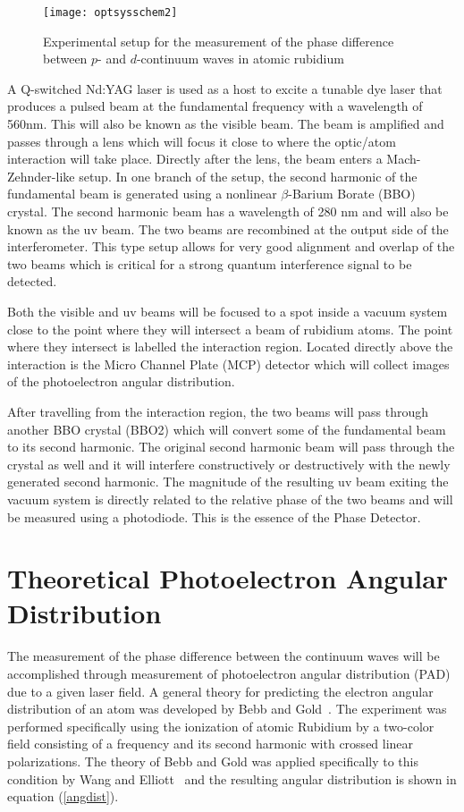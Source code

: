 \begin{figure}
\texttt{[image: optsysschem2]}
\caption[Experimental setup]{Experimental setup for the
measurement of the phase difference between $p$- and $d$-continuum
waves in atomic rubidium} \label{sysschem}
\end{figure}

A Q-switched Nd:YAG laser is used as a host to excite a tunable
dye laser that produces a pulsed beam at the fundamental frequency
with a wavelength of 560nm.  This will also be known as the
visible beam.  The beam is amplified and passes through a lens
which will focus it close to where the optic/atom interaction will
take place.  Directly after the lens, the beam enters a
Mach-Zehnder-like setup.  In one branch of the setup, the second
harmonic of the fundamental beam is generated using a nonlinear
$\beta$-Barium Borate (BBO) crystal.  The second harmonic beam has
a wavelength of 280 nm and will also be known as the uv beam.  The
two beams are recombined at the output side of the interferometer.
This type setup allows for very good alignment and overlap of the
two beams which is critical for a strong quantum interference
signal to be detected.

Both the visible and uv beams will be focused to a spot inside a
vacuum system close to the point where they will intersect a beam
of rubidium atoms. The point where they intersect is labelled the
interaction region. Located directly above the interaction is the
Micro Channel Plate (MCP) detector which will collect images of
the photoelectron angular distribution.

After travelling from the interaction region, the two beams will
pass through another BBO crystal (BBO2) which will convert some of
the fundamental beam to its second harmonic.  The original second
harmonic beam will pass through the crystal as well and it will
interfere constructively or destructively with the newly generated
second harmonic. The magnitude of the resulting uv beam exiting
the vacuum system is directly related to the relative phase of the
two beams and will be measured using a photodiode.  This is the
essence of the Phase Detector.

\section{Theoretical Photoelectron Angular Distribution}
\label{theopad}

The measurement of the phase difference between the continuum
waves will be accomplished through measurement of photoelectron
angular distribution (PAD) due to a given laser field.  A general
theory for predicting the electron angular distribution of an atom
was developed by Bebb and Gold~\cite{Bebb}.  The experiment was
performed specifically using the ionization of atomic Rubidium by
a two-color field consisting of a frequency and its second
harmonic with crossed linear polarizations.  The theory of Bebb
and Gold was applied specifically to this condition by Wang and
Elliott~\cite{Wang1} and the resulting angular distribution is
shown in equation (\ref{angdist}).


